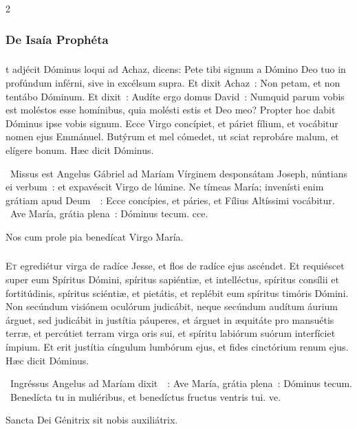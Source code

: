 \documentclass[9pt,twoside]{extarticle}
\begin{document}
\begin{multicols}{2}
{\subsubsection*{\center De Isaía Prophéta}
\subsubsection*{\center {}}
t adjécit Dóminus loqui ad Achaz, dicens:
Pete tibi signum a Dómino Deo tuo in profúndum inférni, sive in excélsum supra.
Et dixit Achaz~: Non petam, et non tentábo Dóminum.
Et dixit~: Audíte ergo domus David~: Numquid parum vobis est moléstos esse homínibus, quia molésti estis et Deo meo?
Propter hoc dabit Dóminus ipse vobis signum. Ecce Virgo concípiet, et páriet fílium, et vocábitur nomen ejus Emmánuel.
Butýrum et mel cómedet, ut sciat reprobáre malum, et elígere bonum. Hæc dicit Dóminus.

\begin{tightlist}{}
\item {}~Missus est Angelus Gábriel ad Maríam Vírginem desponsátam Joseph, núntians ei verbum~: et expavéscit Virgo de lúmine. Ne tímeas María; invenísti enim grátiam apud Deum~~: \textred{*} Ecce concípies, et páries, et Fílius Altíssimi vocábitur.  ~Ave María, grátia plena~: Dóminus tecum. cce.
\item {\small {} Nos cum prole pia benedícat Virgo María.}
\end{tightlist}

\subsubsection*{}
\lettrine{E}t egrediétur virga de radíce Jesse, et flos de radíce ejus ascéndet.
Et requiéscet super eum Spíritus Dómini, spíritus sapiéntiæ, et intelléctus, spíritus consílii et fortitúdinis, spíritus sciéntiæ, et pietátis,
et replébit eum spíritus timóris Dómini. Non secúndum visiónem oculórum judicábit, neque secúndum audítum áurium árguet,
sed judicábit in justítia páuperes, et árguet in æquitáte pro mansuétis terræ, et percútiet terram virga oris sui, et spíritu labiórum suórum interfíciet ímpium.
Et erit justítia cíngulum lumbórum ejus, et fides cinctórium renum ejus.
Hæc dicit Dóminus.

\begin{tightlist}{}
\item {}~Ingréssus Angelus ad Maríam dixit~~: \textred{*} Ave María, grátia plena~: Dóminus tecum. ~Benedícta tu in muliéribus, et benedíctus fructus ventris tui. ve.
\item {\small {} Sancta Dei Génitrix sit nobis auxiliátrix.}
\end{tightlist}

}
\end{multicols}
\end{document}
